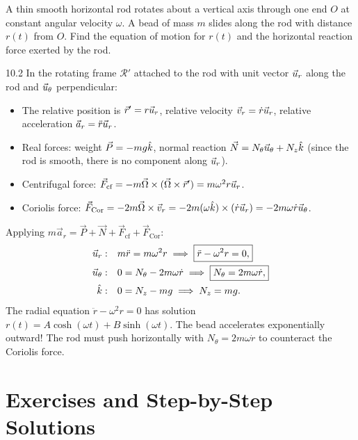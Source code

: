 \begin{worked}
A thin smooth horizontal rod rotates about a vertical axis through one end $O$ at constant angular velocity $\omega$. A bead of mass $m$ slides along the rod with distance $r(t)$ from $O$. Find the equation of motion for $r(t)$ and the horizontal reaction force exerted by the rod.
\end{worked}

\begin{solution}{10.2}
In the rotating frame $\mathcal{R}'$ attached to the rod with unit vector $\vec{u}_r$ along the rod and $\vec{u}_\theta$ perpendicular:
\begin{itemize}[leftmargin=1.4em,itemsep=2pt]
  \item The relative position is $\vec{r}' = r\vec{u}_r$, relative velocity $\vec{v}_r = \dot{r}\vec{u}_r$, relative acceleration $\vec{a}_r = \ddot{r}\vec{u}_r$.
  \item Real forces: weight $\vec{P} = -mg\hat{k}$, normal reaction $\vec{N} = N_\theta\vec{u}_\theta + N_z\hat{k}$ (since the rod is smooth, there is no component along $\vec{u}_r$).
  \item Centrifugal force: $\vec{F}_{\text{cf}} = -m\vec{\Omega}\times(\vec{\Omega}\times\vec{r}') = m\omega^2 r\vec{u}_r$.
  \item Coriolis force: $\vec{F}_{\text{Cor}} = -2m\vec{\Omega}\times\vec{v}_r = -2m(\omega\hat{k})\times(\dot{r}\vec{u}_r) = -2m\omega\dot{r}\vec{u}_\theta$.
\end{itemize}
Applying $m\vec{a}_r = \vec{P} + \vec{N} + \vec{F}_{\text{cf}} + \vec{F}_{\text{Cor}}$:
\begin{align*}
\vec{u}_r:\quad & m\ddot{r} = m\omega^2 r \implies \boxed{\ddot{r} - \omega^2 r = 0,} \\
\vec{u}_\theta:\quad & 0 = N_\theta - 2m\omega\dot{r} \implies \boxed{N_\theta = 2m\omega\dot{r},} \\
\hat{k}:\quad & 0 = N_z - mg \implies N_z = mg.
\end{align*}
The radial equation $\ddot{r} - \omega^2 r = 0$ has solution $r(t) = A\cosh(\omega t) + B\sinh(\omega t)$. The bead accelerates exponentially outward! The rod must push horizontally with $N_\theta = 2m\omega\dot{r}$ to counteract the Coriolis force.
\end{solution}

\section{Exercises and Step-by-Step Solutions}

